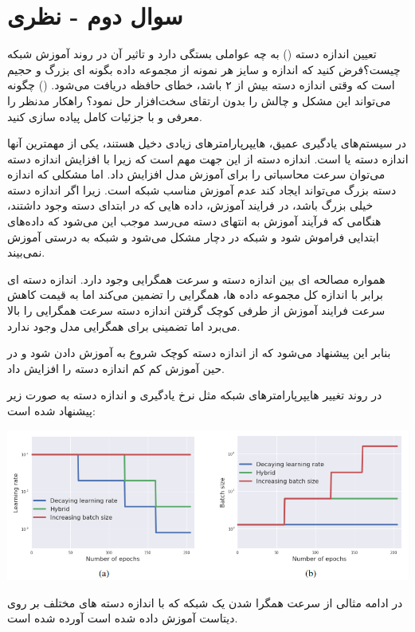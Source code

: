 \section{سوال دوم - نظری}
تعیین اندازه دسته () به چه عواملی بستگی دارد و تاثیر آن در روند آموزش شبکه چیست؟فرض کنید که اندازه و سایز هر نمونه از مجموعه داده بگونه ای بزرگ و حجیم است که وقتی اندازه دسته بیش از ۲ باشد، خطای حافظه دریافت می‌شود. () چگونه می‌تواند این مشکل و چالش را بدون ارتقای سخت‌افزار حل نمود؟ راهکار مدنظر را معرفی و با جزئیات کامل پیاده سازی کنید.







\begin{qsolve}
	در سیستم‌های یادگیری عمیق، هایپرپارامتر‌های زیادی دخیل هستند، یکی از مهمترین آنها اندازه دسته یا  است. \cite{ref1} اندازه دسته از این جهت مهم است که زیرا با افزایش اندازه دسته می‌توان سرعت محاسباتی را برای آموزش مدل افزایش داد. اما مشکلی که اندازه دسته بزرگ می‌تواند ایجاد کند عدم آموزش مناسب شبکه است. زیرا اگر اندازه دسته خیلی بزرگ باشد، در فرایند آموزش، داده هایی که در ابتدای دسته وجود داشتند، هنگامی که فرآیند آموزش به انتهای دسته می‌رسد موجب این می‌شود که داده‌های ابتدایی فراموش شود و شبکه در  دچار مشکل می‌شود و شبکه به درستی آموزش نمی‌بیند. \cite{ref2}
	
همواره مصالحه ای بین اندازه دسته و سرعت همگرایی وجود دارد. اندازه دسته ای برابر با اندازه کل مجموعه داده ها، همگرایی را تضمین می‌کند اما به قیمت کاهش سرعت فرایند آموزش از طرفی کوچک گرفتن اندازه دسته سرعت همگرایی را بالا می‌برد اما تضمینی برای همگرایی مدل وجود ندارد. \cite{ref2}

بنابر این پیشنهاد می‌شود که از اندازه دسته کوچک شروع به آموزش دادن شود و در حین آموزش کم کم اندازه دسته را افزایش داد. \cite{ref2}

در \cite{ref2} روند تغییر هایپرپارامترهای شبکه مثل نرخ یادگیری و اندازه دسته به صورت زیر پیشنهاد شده است:

\begin{center}
	\includegraphics*[width=1\linewidth]{pics/img6.png}
	\label{روند تغییر پویا هایپرپارامترهای مهم شبکه}
\end{center}

	در ادامه مثالی از سرعت همگرا شدن یک شبکه  که با اندازه دسته های مختلف بر روی دیتاست  آموزش داده شده است آورده شده است.
\end{qsolve}







